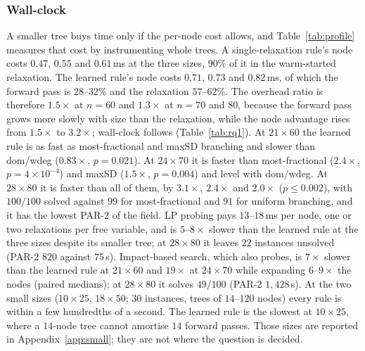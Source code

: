 \documentclass[final,5p,times,twocolumn,authoryear]{elsarticle}
\begin{document}
\subsubsection{Wall-clock}
A smaller tree buys time only if the per-node cost allows, and Table~\ref{tab:profile} measures that cost by instrumenting whole trees. A single-relaxation rule's node costs $0.47$, $0.55$ and $0.61$\,ms at the three sizes, $90\%$ of it in the warm-started relaxation. The learned rule's node costs $0.71$, $0.73$ and $0.82$\,ms, of which the forward pass is $28$--$32\%$ and the relaxation $57$--$62\%$. The overhead ratio is therefore $1.5\times$ at $n=60$ and $1.3\times$ at $n=70$ and $80$, because the forward pass grows more slowly with size than the relaxation, while the node advantage rises from $1.5\times$ to $3.2\times$; wall-clock follows (Table~\ref{tab:rq1}). At $21\times60$ the learned rule is as fast as most-fractional and maxSD branching and slower than dom/wdeg ($0.83\times$, $p=0.021$). At $24\times70$ it is faster than most-fractional ($2.4\times$, $p=4\times10^{-4}$) and maxSD ($1.5\times$, $p=0.004$) and level with dom/wdeg. At $28\times80$ it is faster than all of them, by $3.1\times$, $2.4\times$ and $2.0\times$ ($p\le0.002$), with $100/100$ solved against $99$ for most-fractional and $91$ for uniform branching, and it has the lowest PAR-2 of the field. LP probing pays $13$--$18$\,ms per node, one or two relaxations per free variable, and is $5$--$8\times$ slower than the learned rule at the three sizes despite its smaller tree; at $28\times80$ it leaves $22$ instances unsolved (PAR-2 $820$ against $75$\,s). Impact-based search, which also probes, is $7\times$ slower than the learned rule at $21\times60$ and $19\times$ at $24\times70$ while expanding $6$--$9\times$ the nodes (paired medians); at $28\times80$ it solves $49/100$ (PAR-2 $1{,}428$\,s).
At the two small sizes ($10\times25$, $18\times50$; $30$ instances, trees of $14$--$120$ nodes) every rule is within a few hundredths of a second. The learned rule is the slowest at $10\times25$, where a $14$-node tree cannot amortise $14$ forward passes. Those sizes are reported in Appendix~\ref{app:small}; they are not where the question is decided.
\end{document}
